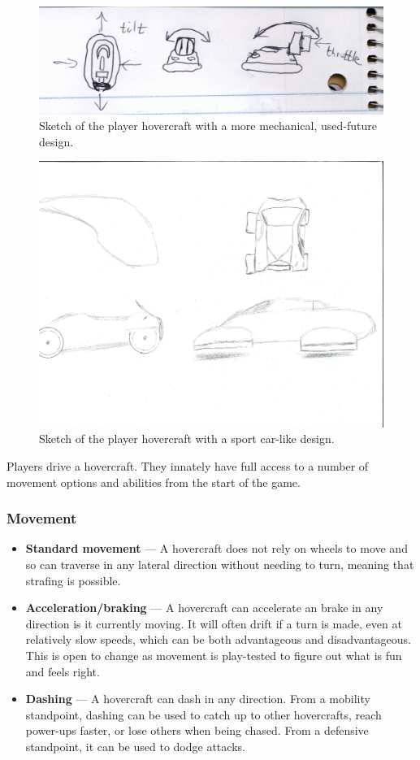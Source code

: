 \documentclass{article}
\theoremstyle{definition}
\begin{document}
\begin{figure}[htpb]
  \centering
  \includegraphics[width=0.8\linewidth]{images/Brainstorming_003.png}
  \caption{Sketch of the player hovercraft with a more mechanical, used-future
  design.}
\label{fig:Brainstorming_003}
\end{figure}

\begin{figure}[htpb]
  \centering
  \includegraphics[width=0.8\linewidth]{images/austin_car1.pdf}
  \caption{Sketch of the player hovercraft with a sport car-like design.}
\label{fig:austin_car1}
\end{figure}

Players drive a hovercraft. They innately have full access to a number of
movement options and abilities from the start of the game.

\subsubsection{Movement}

\begin{itemize}
  \item \textbf{Standard movement} --- A hovercraft does not rely on wheels to
    move and so can traverse in any lateral direction without needing to turn,
    meaning that strafing is possible.
  \item \textbf{Acceleration/braking} --- A hovercraft can accelerate an brake
    in any direction is it currently moving. It will often drift if a turn is
    made, even at relatively slow speeds, which can be both advantageous and
    disadvantageous. This is open to change as movement is play-tested to
    figure out what is fun and feels right.
  \item \textbf{Dashing} --- A hovercraft can dash in any direction. From
    a mobility standpoint, dashing can be used to catch up to other
    hovercrafts, reach power-ups faster, or lose others when being chased. From
    a defensive standpoint, it can be used to dodge attacks.
\end{itemize}
\end{document}
